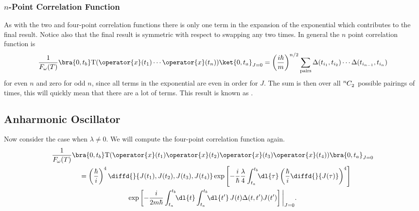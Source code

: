 \documentclass[fleqn]{NotesClass}
\newcommand*{\timeorder}{\mathrm{T}}
\begin{document}
    \subsubsection{\(n\)-Point Correlation Function}
    As with the two and four-point correlation functions there is only one term in the expansion of the exponential which contributes to the final result.
    Notice also that the final result is symmetric with respect to swapping any two times.
    In general the \(n\) point correlation function is
    \begin{equation*}
        \frac{1}{F_{\omega}(T)} \bra{0, t_b} \timeorder(\operator{x}(t_1) \dotsm \operator{x}(t_n)) \ket{0, t_a}_{J = 0} = \left( \frac{i\hbar}{m} \right)^{n/2} \sum_{\text{pairs}} \Delta(t_{i_1}, t_{i_2}) \dotsm \Delta(t_{i_{n-1}}, t_{i_n})
    \end{equation*}
    for even \(n\) and zero for odd \(n\), since all terms in the exponential are even in order for \(J\).
    The sum is then over all \(\tensor[^n]{C}{_2}\) possible pairings of times, this will quickly mean that there are a lot of terms.
    This result is known as .
    
    \subsection{Anharmonic Oscillator}
    Now consider the case when \(\lambda \ne 0\).
    We will compute the four-point correlation function again.
    \begin{multline}
        \frac{1}{F_{\omega}(T)} \bra{0, t_b} \timeorder (\operator{x}(t_1)\operator{x}(t_2)\operator{x}(t_3)\operator{x}(t_4)) \bra{0, t_a}_{J=0}\\
        \quad= \left( \frac{\hbar}{i} \right)^4 \diffd{}{J(t_1),J(t_2),J(t_3),J(t_4)} \exp\left[ -\frac{i}{\hbar} \frac{\lambda}{4} \int_{t_a}^{t_b} \!\! \dl{\tau} \left( \frac{\hbar}{i} \diffd{}{J(\tau)} \right)^4 \right]\\
        \exp\left[ -\frac{i}{2m\hbar} \int_{t_a}^{t_b} \!\! \dl{t} \int_{t_a}^{t_b} \!\! \dl{t'} \, J(t)\Delta(t, t')J(t') \right] \bigg\vert_{J=0}.
    \end{multline}
    
\end{document}

